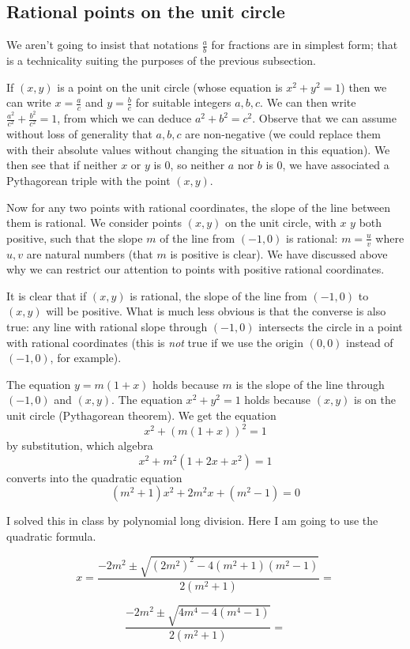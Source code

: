 \documentclass[12pt]{article}
\begin{document}
\subsection{Rational points on the unit circle}

We aren't going to insist that notations $\frac ab$ for fractions are in simplest form; that is a technicality suiting the purposes of the previous subsection.

If $(x,y)$ is a point on the unit circle (whose equation is $x^2+y^2=1$) then we can write $x=\frac ac$ and $y=\frac bc$ for suitable integers $a,b,c$.  We can then write $\frac {a^2}{c^2} + \frac{b^2}{c^2}=1$, from which we can
deduce $a^2+b^2=c^2$.  Observe that we can assume without loss of generality that $a,b,c$ are non-negative
(we could replace them with their absolute values without changing the situation in this equation).  We then see that
if neither $x$ or $y$ is 0, so neither $a$ nor $b$ is 0, we have associated a Pythagorean triple with the point $(x,y)$.

Now for any two points with rational coordinates, the slope of the line between them is rational.  We consider
points $(x,y)$ on the unit circle, with $x$ $y$ both positive, such that the slope $m$ of the line from $(-1,0)$ is rational: $m=\frac uv$ where $u,v$ are natural numbers (that $m$ is positive is clear).  We have discussed above why we can restrict our attention to points with positive rational coordinates.

It is clear that if $(x,y)$ is rational, the slope of the line from $(-1,0)$ to $(x,y)$ will be positive.   What is much less obvious is that the converse is also true:  any line with rational slope through $(-1,0)$ intersects the circle in a point with rational coordinates (this is {\em not\/} true if we use the origin $(0,0)$ instead of $(-1,0)$, for example).

The equation $y=m(1+x)$ holds because $m$ is the slope of the line through $(-1,0)$ and $(x,y)$.   The equation
$x^2+y^2=1$ holds because $(x,y)$ is on the unit circle (Pythagorean theorem).  We get the equation
$$x^2 + (m(1+x))^2=1$$ by substitution, which algebra $$x^2 +m^2(1+2x+x^2)=1$$  converts into the quadratic equation
$$(m^2+1)x^2 + 2m^2x + (m^2-1)=0$$

I solved this in class by polynomial long division.  Here I am going to use the quadratic formula.

$$x=\frac{-2m^2\pm\sqrt{(2m^2)^2 - 4(m^2+1)(m^2-1)}}{2(m^2+1)}=$$

$$\frac{-2m^2\pm\sqrt{4m^4 - 4(m^4-1)}}{2(m^2+1)}=$$
\end{document}
